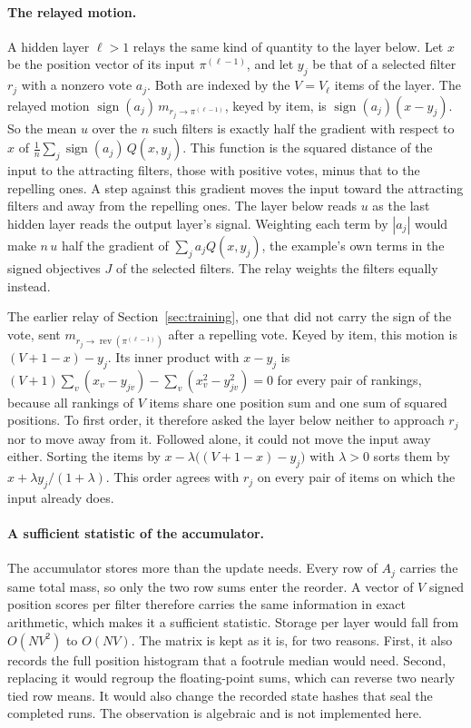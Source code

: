 \paragraph{The relayed motion.} A hidden layer $\ell>1$ relays the same kind of quantity to the layer below. Let $x$ be the position vector of its input $\pi^{(\ell-1)}$, and let $y_j$ be that of a selected filter $r_j$ with a nonzero vote $a_j$. Both are indexed by the $V=V_\ell$ items of the layer. The relayed motion $\operatorname{sign}(a_j)\,m_{r_j\to\pi^{(\ell-1)}}$, keyed by item, is $\operatorname{sign}(a_j)(x-y_j)$. So the mean $u$ over the $n$ such filters is exactly half the gradient with respect to $x$ of $\tfrac1n\sum_j\operatorname{sign}(a_j)\,Q(x,y_j)$. This function is the squared distance of the input to the attracting filters, those with positive votes, minus that to the repelling ones. A step against this gradient moves the input toward the attracting filters and away from the repelling ones. The layer below reads $u$ as the last hidden layer reads the output layer's signal. Weighting each term by $|a_j|$ would make $n\,u$ half the gradient of $\sum_ja_jQ(x,y_j)$, the example's own terms in the signed objectives $J$ of the selected filters. The relay weights the filters equally instead.

The earlier relay of Section~\ref{sec:training}, one that did not carry the sign of the vote, sent $m_{r_j\to\operatorname{rev}(\pi^{(\ell-1)})}$ after a repelling vote. Keyed by item, this motion is $(V+1-x)-y_j$. Its inner product with $x-y_j$ is $(V+1)\sum_v(x_v-y_{jv})-\sum_v(x_v^2-y_{jv}^2)=0$ for every pair of rankings, because all rankings of $V$ items share one position sum and one sum of squared positions. To first order, it therefore asked the layer below neither to approach $r_j$ nor to move away from it. Followed alone, it could not move the input away either. Sorting the items by $x-\lambda\bigl((V+1-x)-y_j\bigr)$ with $\lambda>0$ sorts them by $x+\lambda y_j/(1+\lambda)$. This order agrees with $r_j$ on every pair of items on which the input already does.

\paragraph{A sufficient statistic of the accumulator.} The accumulator stores more than the update needs. Every row of $A_j$ carries the same total mass, so only the two row sums enter the reorder. A vector of $V$ signed position scores per filter therefore carries the same information in exact arithmetic, which makes it a sufficient statistic. Storage per layer would fall from $O(NV^2)$ to $O(NV)$. The matrix is kept as it is, for two reasons. First, it also records the full position histogram that a footrule median would need. Second, replacing it would regroup the floating-point sums, which can reverse two nearly tied row means. It would also change the recorded state hashes that seal the completed runs. The observation is algebraic and is not implemented here.

